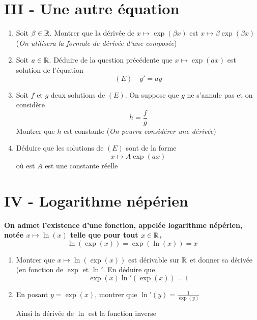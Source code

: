 \section*{III - Une autre équation}
\begin{enumerate}
\item Soit $\beta \in \mathbb{R}$. Montrer que la dérivée de $x\mapsto \exp(\beta x)$ est $x\mapsto \beta \exp(\beta x)$ (\emph{On utilisera la formule de dérivée d'une composée})
\item Soit $a \in \mathbb{R}$. Déduire de la question précédente que $x\mapsto \exp(ax)$ est solution de l'équation $$(E) \quad y' = a y$$
\item Soit $f$ et $g$ deux solutions de $(E)$. On suppose que $g$ ne s'annule pas et on considère $$h = \frac{f}{g}$$ Montrer que $h$ est constante (\emph{On pourra considérer une dérivée})
\item Déduire que les solutions de $(E)$ sont de la forme $$x \mapsto A \exp(ax)$$ où est $A$ est une constante réelle
\end{enumerate}
\section*{IV - Logarithme népérien}
\textbf{On admet l'existence d'une fonction, appelée logarithme népérien, notée $x\mapsto \ln(x)$ telle que pour tout $x\in \mathbb{R}$, $$\boxed{\ln(\exp(x)) = \exp(\ln(x)) = x}$$}
\begin{enumerate}
\item Montrer que $x \mapsto \ln(\exp(x))$ est dérivable sur $\mathbb{R}$ et donner sa dérivée (en fonction de $\exp$ et $\ln'$. En déduire que 
$$\exp(x) \ln'(\exp(x)) = 1$$
\item En posant $y = \exp(x)$, montrer que $\ln'(y) = \frac{1}{\exp(y)}$\newline

Ainsi la dérivée de $\ln$ est la fonction inverse
\end{enumerate}

